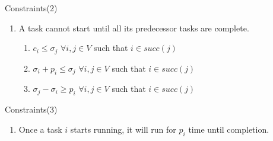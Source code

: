 \documentclass[10pt]{beamer}
\begin{document}
\begin{frame}{Constraints(2)}
\begin{enumerate}[3]
    \item A task cannot start until all its predecessor tasks are complete.
    \begin{enumerate}
        
        \item[] $ c_i \leq \sigma_j$  $\forall i,j \in V$ such that \quad $i \in succ(j)$ 
        
        \item[] $ \sigma_i + p_i \leq \sigma_j$  $\forall i,j \in V$ such that \quad $i \in succ(j)$ 
        
        \item[] $ \sigma_j - \sigma_i \geq p_i$  $\forall i,j \in V$ such that \quad $i \in succ(j)$ 
        
        
        
        
    \end{enumerate}
\end{enumerate}
\end{frame}


\begin{frame}{Constraints(3)}
    \begin{enumerate}[4]
    \item Once a task $i$ starts running, it will run for $p_i$ time until completion.
\end{enumerate}
\end{frame}
\end{document}

